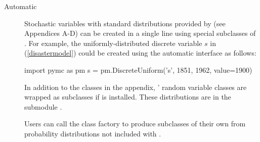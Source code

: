\documentclass[]{jss}
\begin{document}
\begin{description}
    \item[Automatic] Stochastic variables with standard distributions provided by  (see Appendices A-D) can be created in a single line using special subclasses of . For example, the uniformly-distributed discrete variable $s$ in (\ref{disastermodel}) could be created using the automatic interface as follows:
\begin{CodeInput}
import pymc as pm
s = pm.DiscreteUniform('s', 1851, 1962, value=1900)
\end{CodeInput}

    In addition to the classes in the appendix, ' random variable classes are wrapped as  subclasses if  is installed. These distributions are in the submodule .

    Users can call the class factory  to produce  subclasses of their own from probability distributions not included with .%



\end{description}
\end{document}
